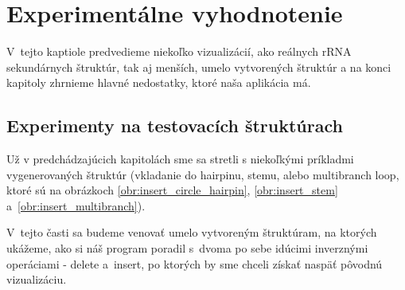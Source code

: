 
\chapter{Experimentálne vyhodnotenie}

V~tejto kaptiole predvedieme niekoľko vizualizácií, ako reálnych rRNA
sekundárnych štruktúr, tak aj menších, umelo vytvorených štruktúr
a na konci kapitoly zhrnieme hlavné nedostatky, ktoré naša aplikácia má.



\section{Experimenty na testovacích štruktúrach}

Už v predchádzajúcich kapitolách sme sa stretli s niekoľkými príkladmi vygenerovaných
štruktúr (vkladanie do hairpinu, stemu, alebo multibranch loop, ktoré sú
na obrázkoch \ref{obr:insert_circle_hairpin}, \ref{obr:insert_stem} a~\ref{obr:insert_multibranch}).

V~tejto časti sa budeme venovať umelo vytvoreným štruktúram, na ktorých ukážeme,
ako si náš program poradil s~dvoma po sebe idúcimi inverznými
operáciami - delete a~insert, po ktorých by sme chceli získať
naspäť pôvodnú vizualizáciu.

